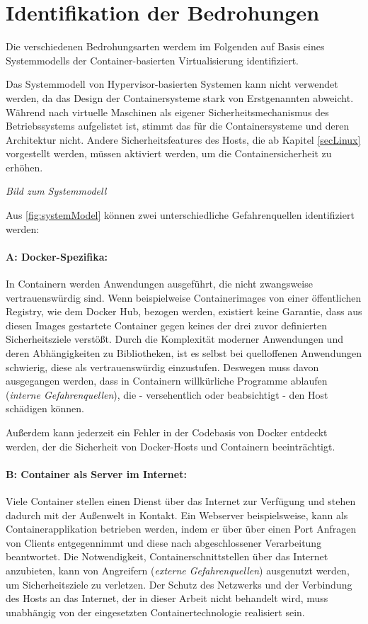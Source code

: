 \documentclass[../main.tex]{subfiles}
\begin{document}
  \section{Identifikation der Bedrohungen}
    Die verschiedenen Bedrohungsarten werdem im Folgenden auf Basis eines Systemmodells der Container-basierten Virtualisierung identifiziert.

    Das Systemmodell von Hypervisor-basierten Systemen kann nicht verwendet werden, da das Design der Containersysteme stark von Erstgenannten abweicht. Während nach \cite[S.125]{CISSP} virtuelle Maschinen als eigener Sicherheitsmechanismus des Betriebssystems aufgelistet ist, stimmt das für die Containersysteme und deren Architektur nicht. Andere Sicherheitsfeatures des Hosts, die ab Kapitel \ref{secLinux} vorgestellt werden, müssen aktiviert werden, um die Containersicherheit zu erhöhen.

    \emph{Bild zum Systemmodell}

    Aus \fig \ref{fig:systemModel} können zwei unterschiedliche Gefahrenquellen identifiziert werden:


    \paragraph{A: Docker-Spezifika:}
    In Containern werden Anwendungen ausgeführt, die nicht zwangsweise vertrauenswürdig sind. Wenn beispielweise Containerimages von einer öffentlichen Registry, wie dem Docker Hub, bezogen werden, existiert keine Garantie, dass aus diesen Images gestartete Container gegen keines der drei zuvor definierten Sicherheitsziele verstößt. Durch die Komplexität moderner Anwendungen und deren Abhängigkeiten zu Bibliotheken, ist es selbst bei quelloffenen Anwendungen schwierig, diese als vertrauenswürdig einzustufen. Deswegen muss davon ausgegangen werden, dass in Containern willkürliche Programme ablaufen (\emph{interne Gefahrenquellen}), die - versehentlich oder beabsichtigt - den Host schädigen können.

    Außerdem kann jederzeit ein Fehler in der Codebasis von Docker entdeckt werden, der die Sicherheit von Docker-Hosts und Containern beeinträchtigt.

    \paragraph{B: Container als Server im Internet:}
    Viele Container stellen einen Dienst über das Internet zur Verfügung und stehen dadurch mit der Außenwelt in Kontakt. Ein Webserver beispielsweise, kann als Containerapplikation betrieben werden, indem er über über einen Port Anfragen von Clients entgegennimmt und diese nach abgeschlossener Verarbeitung beantwortet. Die Notwendigkeit, Containerschnittstellen über das Internet anzubieten, kann von Angreifern (\emph{externe Gefahrenquellen}) ausgenutzt werden, um Sicherheitsziele zu verletzen. Der Schutz des Netzwerks und der Verbindung des Hosts an das Internet, der in dieser Arbeit nicht behandelt wird, muss unabhängig von der eingesetzten Containertechnologie realisiert sein.
\end{document}
